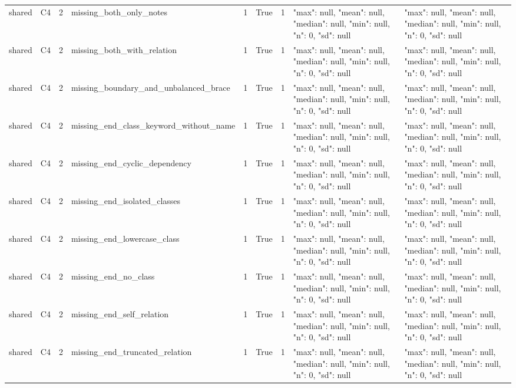 \begin{tabular}{lllllllll}
shared & C4 & 2 & missing\_both\_only\_notes & 1 & True & 1 & {"max": null, "mean": null, "median": null, "min": null, "n": 0, "sd": null} & {"max": null, "mean": null, "median": null, "min": null, "n": 0, "sd": null} \\
shared & C4 & 2 & missing\_both\_with\_relation & 1 & True & 1 & {"max": null, "mean": null, "median": null, "min": null, "n": 0, "sd": null} & {"max": null, "mean": null, "median": null, "min": null, "n": 0, "sd": null} \\
shared & C4 & 2 & missing\_boundary\_and\_unbalanced\_brace & 1 & True & 1 & {"max": null, "mean": null, "median": null, "min": null, "n": 0, "sd": null} & {"max": null, "mean": null, "median": null, "min": null, "n": 0, "sd": null} \\
shared & C4 & 2 & missing\_end\_class\_keyword\_without\_name & 1 & True & 1 & {"max": null, "mean": null, "median": null, "min": null, "n": 0, "sd": null} & {"max": null, "mean": null, "median": null, "min": null, "n": 0, "sd": null} \\
shared & C4 & 2 & missing\_end\_cyclic\_dependency & 1 & True & 1 & {"max": null, "mean": null, "median": null, "min": null, "n": 0, "sd": null} & {"max": null, "mean": null, "median": null, "min": null, "n": 0, "sd": null} \\
shared & C4 & 2 & missing\_end\_isolated\_classes & 1 & True & 1 & {"max": null, "mean": null, "median": null, "min": null, "n": 0, "sd": null} & {"max": null, "mean": null, "median": null, "min": null, "n": 0, "sd": null} \\
shared & C4 & 2 & missing\_end\_lowercase\_class & 1 & True & 1 & {"max": null, "mean": null, "median": null, "min": null, "n": 0, "sd": null} & {"max": null, "mean": null, "median": null, "min": null, "n": 0, "sd": null} \\
shared & C4 & 2 & missing\_end\_no\_class & 1 & True & 1 & {"max": null, "mean": null, "median": null, "min": null, "n": 0, "sd": null} & {"max": null, "mean": null, "median": null, "min": null, "n": 0, "sd": null} \\
shared & C4 & 2 & missing\_end\_self\_relation & 1 & True & 1 & {"max": null, "mean": null, "median": null, "min": null, "n": 0, "sd": null} & {"max": null, "mean": null, "median": null, "min": null, "n": 0, "sd": null} \\
shared & C4 & 2 & missing\_end\_truncated\_relation & 1 & True & 1 & {"max": null, "mean": null, "median": null, "min": null, "n": 0, "sd": null} & {"max": null, "mean": null, "median": null, "min": null, "n": 0, "sd": null} \\

\end{tabular}
